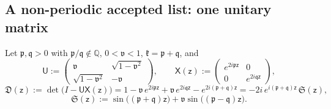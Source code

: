\documentclass[11pt,reqno]{amsart}
\numberwithin{equation}{section}
\theoremstyle{plain}
\theoremstyle{definition}
\theoremstyle{remark}
\begin{document}
\subsection{A non-periodic accepted list: one unitary matrix}
\label{subsec:graph-model}

Let $\mathfrak p,\mathfrak q>0$ with $\mathfrak p/\mathfrak q\notin\mathbb Q$, $0<\mathfrak v<1$, $\mathfrak k=\mathfrak p+\mathfrak q$, and
\begin{equation}\label{eq:graph-matrices}
 \mathsf U:=\begin{pmatrix}\mathfrak v&\sqrt{1-\mathfrak v^2}\\ \sqrt{1-\mathfrak v^2}&-\mathfrak v\end{pmatrix},\qquad
 \mathsf X(\mathsf z):=\begin{pmatrix}e^{2i\mathfrak p\mathsf z}&0\\0&e^{2i\mathfrak q\mathsf z}\end{pmatrix},
\end{equation}
\begin{equation}\label{eq:graph-det}
 \mathfrak D(\mathsf z):=\det\bigl(I-\mathsf U\mathsf X(\mathsf z)\bigr)=1-\mathfrak v\,e^{2i\mathfrak p\mathsf z}+\mathfrak v\,e^{2i\mathfrak q\mathsf z}-e^{2i(\mathfrak p+\mathfrak q)\mathsf z}=-2i\,e^{i(\mathfrak p+\mathfrak q)\mathsf z}\,\mathfrak S(\mathsf z),
\end{equation}
\begin{equation}\label{eq:graph-sine}
 \mathfrak S(\mathsf z):=\sin\bigl((\mathfrak p+\mathfrak q)\mathsf z\bigr)+\mathfrak v\sin\bigl((\mathfrak p-\mathfrak q)\mathsf z\bigr).
\end{equation}
\end{document}
